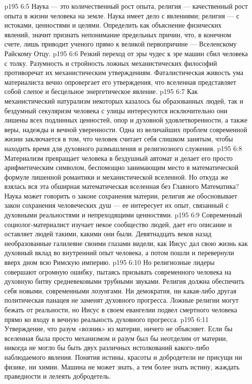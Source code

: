 \vs p195 6:5 Наука --- это количественный рост опыта, религия --- качественный рост опыта в жизни человека на земле. Наука имеет дело с явлениями; религия --- с истоками, ценностями и целями. Определить  как объяснение физических явлений, значит признать непонимание предельных причин, что, в конечном счете, лишь приводит ученого прямо к великой первопричине --- Вселенскому Райскому Отцу.
\vs p195 6:6 Резкий переход от эры чудес к эре машин сбил человека с толку. Разумность и стройность ложных механистических философий противоречат их механистическим утверждениям. Фаталистическая живость ума материалиста вечно опровергает его утверждения, что вселенная представляет собой слепое и бесцельное энергетическое явление.
\vs p195 6:7 Как механистический натурализм некоторых казалось бы образованных людей, так и бездумный секуляризм человека с улицы интересуются исключительно  они лишены всех подлинных ценностей, опор и духовной удовлетворенности, а также веры, надежды и вечной уверенности. Одна из величайших проблем современной жизни заключается в том, что человек считает себя слишком занятым, чтобы находить время для духовного размышления и религиозного служения.
\vs p195 6:8 Материализм превращает человека в бездушный автомат и делает его просто арифметическим символом, беспомощно занимающим место в математической формуле лишенной романтики и механистической вселенной. Но откуда же взялась вся эта обширная математическая вселенная без Главного Математика? Наука может говорить о законе сохранения материи, религия же обосновывает закон сохранения человеческих душ --- ее интересует их опыт, связанный с духовными реальностями и непреходящими ценностями.
\vs p195 6:9 Современный социолог\hyp{}материалист изучает некое сообщество людей, дает его описание и оставляет людей такими, какими они были. Девятнадцать веков назад необразованные галилеяне своими глазами видели, как Иисус дал свою жизнь как духовный вклад во внутренний опыт человека, а потом пошли и перевернули вверх дном всю Римскую империю.
\vs p195 6:10 Но религиозные лидеры совершают огромную ошибку, пытаясь призывать современного человека на духовную битву средневековыми трубными звуками. Религия должна обеспечить себя новыми, современными лозунгами. Ни демократия, ни какая\hyp{}либо другая политическая панацея не заменят духовного прогресса. Ложные религии могут бежать от реальности, но Иисус в своем евангелии подвел смертного человека прямо ко входу в вечную реальность духовного прогресса.
\vs p195 6:11 Утверждение, что разум «возник» из материи, ничего не объясняет. Если бы вселенная была просто механизмом и разум был бы неотделим от материи, никогда не могло бы быть двух различных истолкований какого\hyp{}либо наблюдаемого явления. Понятия истины, красоты и добродетели не присущи ни физике, ни химии. Машина не может знать, а тем более знать истину, жаждать праведности и лелеять добродетель.

